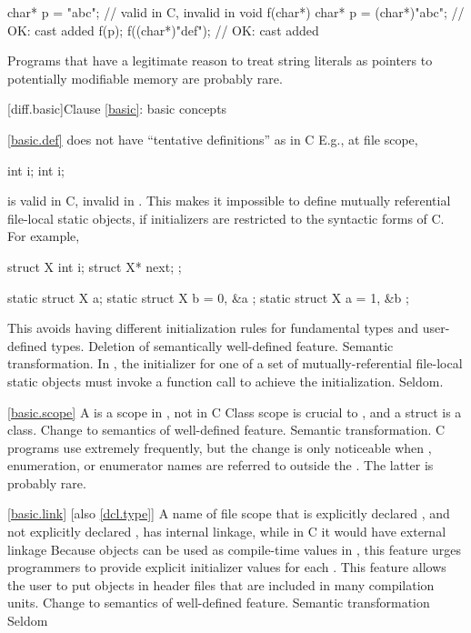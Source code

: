 \begin{codeblock}
char* p = "abc";                // valid in C, invalid in \Cpp
void f(char*) {
  char* p = (char*)"abc";       // OK: cast added
  f(p);
  f((char*)"def");              // OK: cast added
}
\end{codeblock}

\howwide
Programs that have a legitimate reason to treat string literals
as pointers to potentially modifiable memory are probably rare.

[diff.basic]{Clause \ref{basic}: basic concepts}

\ref{basic.def}
\change \Cpp does not have ``tentative definitions'' as in C
E.g., at file scope,

\begin{codeblock}
int i;
int i;
\end{codeblock}

is valid in C, invalid in \Cpp.
This makes it impossible to define
mutually referential file-local static objects, if initializers are
restricted to the syntactic forms of C\@.
For example,

\begin{codeblock}
struct X { int i; struct X* next; };

static struct X a;
static struct X b = { 0, &a };
static struct X a = { 1, &b };
\end{codeblock}

\rationale
This avoids having different initialization rules for
fundamental types and user-defined types.
\effect
Deletion of semantically well-defined feature.
\difficulty
Semantic transformation.
\rationale
In \Cpp, the initializer for one of a set of
mutually-referential file-local static objects must invoke a function
call to achieve the initialization.
\howwide
Seldom.

\ref{basic.scope}
\change A  is a scope in \Cpp, not in C
\rationale
Class scope is crucial to \Cpp, and a struct is a class.
\effect
Change to semantics of well-defined feature.
\difficulty
Semantic transformation.
\howwide
C programs use  extremely frequently, but the
change is only noticeable when , enumeration, or enumerator
names are referred to outside the .
The latter is probably rare.

\ref{basic.link} [also \ref{dcl.type}] 
\change A name of file scope that is explicitly declared , and not explicitly
declared , has internal linkage, while in C it would have external linkage
\rationale
Because  objects can be used as compile-time values in
\Cpp, this feature urges programmers to provide explicit initializer
values for each .
This feature allows the user to put objects in header files that are included
in many compilation units.
\effect
Change to semantics of well-defined feature.
\difficulty
Semantic transformation
\howwide
Seldom

